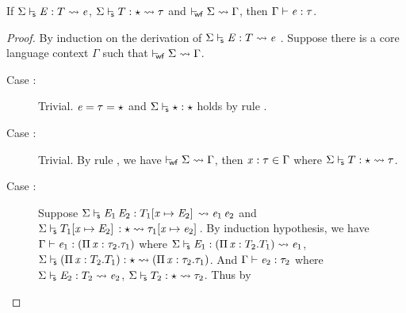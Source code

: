 \begin{lem}
If $ \Sigma  \vdash_{\!\!\mathsf{s} }  \mathit{E}  :  T   \rightsquigarrow   \mathit{e} $, $ \Sigma  \vdash_{\!\!\mathsf{s} }  T  :  \star   \rightsquigarrow   \tau $ and $ \vdash_{\!\!\mathsf{wf} }  \Sigma   \rightsquigarrow   \Gamma $, then
$\Gamma  \vdash  \mathit{e}  :  \tau$.
\end{lem}

\begin{proof}
    By induction on the derivation of $ \Sigma  \vdash_{\!\!\mathsf{s} }  \mathit{E}  :  T   \rightsquigarrow   \mathit{e} $ . Suppose there is
a core language context $\Gamma$ such that $ \vdash_{\!\!\mathsf{wf} }  \Sigma   \rightsquigarrow   \Gamma $.
    \begin{description}
        \item[Case :] Trivial. $\mathit{e} = \tau = \star$ and
$ \Sigma  \vdash_{\!\!\mathsf{s} }  \star  :  \star $ holds by rule .
        \item[Case :] Trivial. By rule , we
have $ \vdash_{\!\!\mathsf{wf} }  \Sigma   \rightsquigarrow   \Gamma $, then $\mathit{x}:\tau  \in  \Gamma$ where $ \Sigma  \vdash_{\!\!\mathsf{s} }  T  :  \star   \rightsquigarrow   \tau $.
        \item[Case :] Suppose $ \Sigma  \vdash_{\!\!\mathsf{s} }  \mathit{E_{{\mathrm{1}}}} \, \mathit{E_{{\mathrm{2}}}}  :  T_{{\mathrm{1}}}  [  \mathit{x}  \mapsto  \mathit{E_{{\mathrm{2}}}}  ] \,   \rightsquigarrow   \mathit{e_{{\mathrm{1}}}} \, \mathit{e_{{\mathrm{2}}}} $ and $ \Sigma  \vdash_{\!\!\mathsf{s} }  T_{{\mathrm{1}}}  [  \mathit{x}  \mapsto  \mathit{E_{{\mathrm{2}}}}  ] \,  :  \star   \rightsquigarrow   \tau_{{\mathrm{1}}}  [  \mathit{x}  \mapsto  \mathit{e_{{\mathrm{2}}}}  ] \, $. By induction
hypothesis, we have $\Gamma  \vdash  \mathit{e_{{\mathrm{1}}}}  :  (  \Pi \, \mathit{x}  :  \tau_{{\mathrm{2}}}  .  \tau_{{\mathrm{1}}}  )$ where $ \Sigma  \vdash_{\!\!\mathsf{s} }  \mathit{E_{{\mathrm{1}}}}  :  (  \Pi \, \mathit{x}  :  T_{{\mathrm{2}}}  .  T_{{\mathrm{1}}}  )   \rightsquigarrow   \mathit{e_{{\mathrm{1}}}} $, $ \Sigma  \vdash_{\!\!\mathsf{s} }  (  \Pi \, \mathit{x}  :  T_{{\mathrm{2}}}  .  T_{{\mathrm{1}}}  )  :  \star   \rightsquigarrow   (  \Pi \, \mathit{x}  :  \tau_{{\mathrm{2}}}  .  \tau_{{\mathrm{1}}}  ) $. And $\Gamma  \vdash  \mathit{e_{{\mathrm{2}}}}  :  \tau_{{\mathrm{2}}}$ where $ \Sigma  \vdash_{\!\!\mathsf{s} }  \mathit{E_{{\mathrm{2}}}}  :  T_{{\mathrm{2}}}   \rightsquigarrow   \mathit{e_{{\mathrm{2}}}} $, $ \Sigma  \vdash_{\!\!\mathsf{s} }  T_{{\mathrm{2}}}  :  \star   \rightsquigarrow   \tau_{{\mathrm{2}}} $. Thus by

\end{description}
\end{proof}
